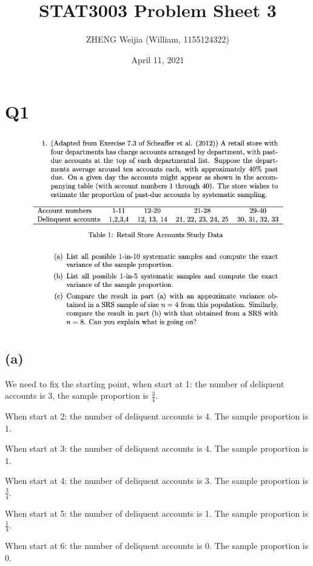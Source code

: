 \documentclass[12pt]{article}%
\begin{document}
\title{STAT3003 Problem Sheet 3}
\author{ZHENG Weijia (William, 1155124322)}
\date{April 11, 2021}
\maketitle


\section{Q1}
\begin{figure}[htp]
    \centering %
    \includegraphics[width = 15cm]{img/Q1.png}
\end{figure}

\subsection{(a)}
We need to fix the starting point, when start at 1: the number of deliquent accounts is 3, 
the sample proportion is $\frac{3}{4}.$ 

When start at 2: the number of deliquent accounts is 4. The sample proportion is $1.$

When start at 3: the number of deliquent accounts is 4. The sample proportion is $1.$ 

When start at 4: the number of deliquent accounts is 3. The sample proportion is $\frac{3}{4}.$ 

When start at 5: the number of deliquent accounts is 1. The sample proportion is $\frac{1}{4}.$ 

When start at 6: the number of deliquent accounts is 0. The sample proportion is $0.$ 
\end{document}
